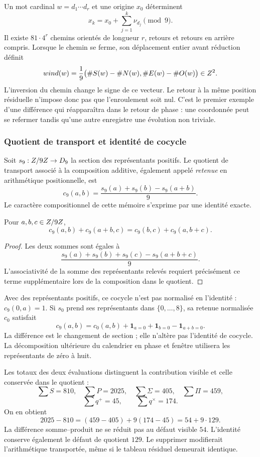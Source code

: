 Un mot cardinal \(w=d_1\cdots d_r\) et une origine \(x_0\) déterminent
\[
 x_k=x_0+\sum_{j=1}^k\nu_{d_j}\pmod9.
\]
Il existe \(81\cdot4^r\) chemins orientés de longueur \(r\), retours et retours en arrière compris. Lorsque le chemin se ferme, son déplacement entier avant réduction définit
\begin{equation}
 wind(w)=\frac19
 \bigl(\#S(w)-\#N(w),\#E(w)-\#O(w)\bigr)\in Z^2.
\end{equation}
L'inversion du chemin change le signe de ce vecteur. Le retour à la même position résiduelle n'impose donc pas que l'enroulement soit nul. C'est le premier exemple d'une différence qui réapparaîtra dans le retour de phase : une coordonnée peut se refermer tandis qu'une autre enregistre une évolution non triviale.

\subsubsection{Quotient de transport et identité de cocycle}

Soit \(s_9:Z/9Z\to D_9\) la section des représentants positifs. Le quotient de transport associé à la composition additive, également appelé \emph{retenue} en arithmétique positionnelle, est
\[
 c_9(a,b)=\frac{s_9(a)+s_9(b)-s_9(a+b)}9.
\]
Le caractère compositionnel de cette mémoire s'exprime par une identité exacte.

\begin{lemma}
Pour \(a,b,c\in Z/9Z\),
\[
 c_9(a,b)+c_9(a+b,c)=c_9(b,c)+c_9(a,b+c).
\]
\end{lemma}
\begin{proof}
Les deux sommes sont égales à
\[
 \frac{s_9(a)+s_9(b)+s_9(c)-s_9(a+b+c)}9.
\]
L'associativité de la somme des représentants relevés requiert précisément ce terme supplémentaire lors de la composition dans le quotient.
\end{proof}

Avec des représentants positifs, ce cocycle n'est pas normalisé en l'identité : \(c_9(0,a)=1\). Si \(s_0\) prend ses représentants dans \(\{0,\ldots,8\}\), sa retenue normalisée \(c_0\) satisfait
\[
 c_9(a,b)=c_0(a,b)+\mathbf1_{a=0}+\mathbf1_{b=0}-\mathbf1_{a+b=0}.
\]
La différence est le changement de section ; elle n'altère pas l'identité de cocycle. La décomposition ultérieure du calendrier en phase et fenêtre utilisera les représentants de zéro à huit.

Les totaux des deux évaluations distinguent la contribution visible et celle conservée dans le quotient :
\[
 \sum S=810,\quad\sum P=2025,\quad
 \sum\Sigma=405,\quad\sum\Pi=459,
\]
\[
 \sum q^+=45,\qquad\sum q^\times=174.
\]
On en obtient
\begin{equation}
 2025-810=(459-405)+9(174-45)=54+9\cdot129.
 \label{eq:defecto-integrado}
\end{equation}
La différence somme--produit ne se réduit pas au défaut visible \(54\). L'identité conserve également le défaut de quotient \(129\). Le supprimer modifierait l'arithmétique transportée, même si le tableau résiduel demeurait identique.

